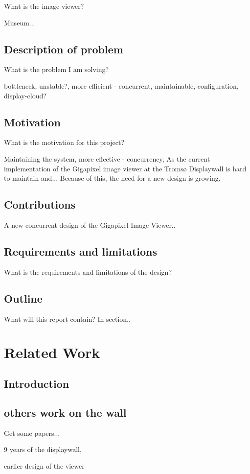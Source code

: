 \documentclass[12pt, a4paper, oneside]{article}
\begin{document}
What is the image viewer?

Museum...


\subsection{Description of problem}
What is the problem I am solving?

bottleneck,
unstable?,
more efficient - concurrent,
maintainable,
configuration,
display-cloud?

\subsection{Motivation}
What is the motivation for this project?

Maintaining the system,
more effective - concurrency,
As the current implementation of the Gigapixel image viewer at the Tromsø Displaywall is hard to maintain and... Because of this, the need for a new design is growing.  

\subsection{Contributions}
A new concurrent design of the Gigapixel Image Viewer..

\subsection{Requirements and limitations}
What is the requirements and limitations of the design?

\subsection{Outline}
What will this report contain?
In section..
\newpage
\section{Related Work}
\subsection{Introduction}
\subsection{others work on the wall}
Get some papers...

9 years of the displaywall,

earlier design of the viewer
\newpage
\end{document}
